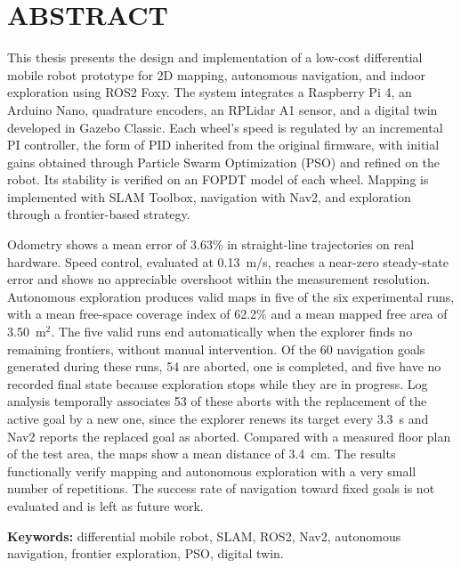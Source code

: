 \chapter*{ABSTRACT}
\thispagestyle{fancy}
{}

This thesis presents the design and implementation of a low-cost differential mobile robot prototype for 2D mapping, autonomous navigation, and indoor exploration using \gls{ROS2} Foxy. The system integrates a Raspberry Pi 4, an \gls{Arduino} Nano, quadrature encoders, an RPLidar A1 sensor, and a digital twin developed in Gazebo Classic. Each wheel's speed is regulated by an incremental PI controller, the form of PID inherited from the original firmware, with initial gains obtained through Particle Swarm Optimization (PSO) and refined on the robot. Its stability is verified on an FOPDT model of each wheel. Mapping is implemented with SLAM Toolbox, navigation with Nav2, and exploration through a frontier-based strategy.

Odometry shows a mean error of 3.63\% in straight-line trajectories on real hardware. Speed control, evaluated at 0.13~m/s, reaches a near-zero steady-state error and shows no appreciable overshoot within the measurement resolution. Autonomous exploration produces valid maps in five of the six experimental runs, with a mean free-space coverage index of 62.2\% and a mean mapped free area of 3.50~m$^2$. The five valid runs end automatically when the explorer finds no remaining frontiers, without manual intervention. Of the 60 navigation goals generated during these runs, 54 are aborted, one is completed, and five have no recorded final state because exploration stops while they are in progress. Log analysis temporally associates 53 of these aborts with the replacement of the active goal by a new one, since the explorer renews its target every 3.3~s and Nav2 reports the replaced goal as aborted. Compared with a measured floor plan of the test area, the maps show a mean distance of 3.4~cm. The results functionally verify mapping and autonomous exploration with a very small number of repetitions. The success rate of navigation toward fixed goals is not evaluated and is left as future work.

\noindent\textbf{Keywords:} differential mobile robot, SLAM, \gls{ROS2}, Nav2, autonomous navigation, frontier exploration, PSO, digital twin.
